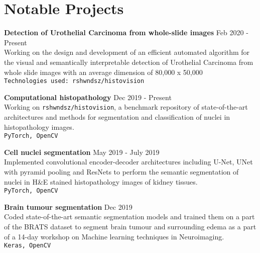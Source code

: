 \documentclass[letterpaper]{article}
\renewenvironment{itemize}{
  \begin{list}{}{
    \setlength{\leftmargin}{1.5em}
  }
}{
  \end{list}
}
\newcommand{\smallGreyFont}[1]{\textcolor{black!80}{\small{#1}}}
\begin{document}
\section*{Notable Projects}
  \begin{itemize}
  \item
    \textbf{Detection of Urothelial Carcinoma from whole-slide images}
    \hfill{\smallGreyFont{Feb 2020 - Present}}\\
      Working on the design and development of an efficient automated algorithm for the visual and semantically interpretable detection of Urothelial Carcinoma from whole slide images with an average dimension of 80,000 x 50,000 \\
      \texttt{\smallGreyFont{Technologies used: rshwndsz/histovision}}

    \item
    \textbf{Computational histopathology}
    \hfill{\smallGreyFont{Dec 2019 - Present}}\\
      Working on \texttt{rshwndsz/histovision}, a benchmark repository of state-of-the-art architectures and methods for segmentation and classification of nuclei in histopathology images.\\
      \texttt{\smallGreyFont{PyTorch, OpenCV}}

    \item
    \textbf{Cell nuclei segmentation}
    \hfill{\smallGreyFont{May 2019 - July 2019}}\\
      Implemented convolutional encoder-decoder architectures including U-Net, UNet with pyramid pooling and ResNets to perform the semantic segmentation of nuclei in H\&E stained histopathology images of kidney tissues.\\
      \texttt{\smallGreyFont{PyTorch, OpenCV}}

    \item
    \textbf{Brain tumour segmentation}
    \hfill{\smallGreyFont{Dec 2019}}\\
       Coded state-of-the-art semantic segmentation models and trained them on a part of the BRATS dataset to segment brain tumour and surrounding edema as a part of a 14-day workshop on Machine learning techniques in Neuroimaging.\\
       \texttt{\smallGreyFont{Keras, OpenCV}}



\end{itemize}
\end{document}
